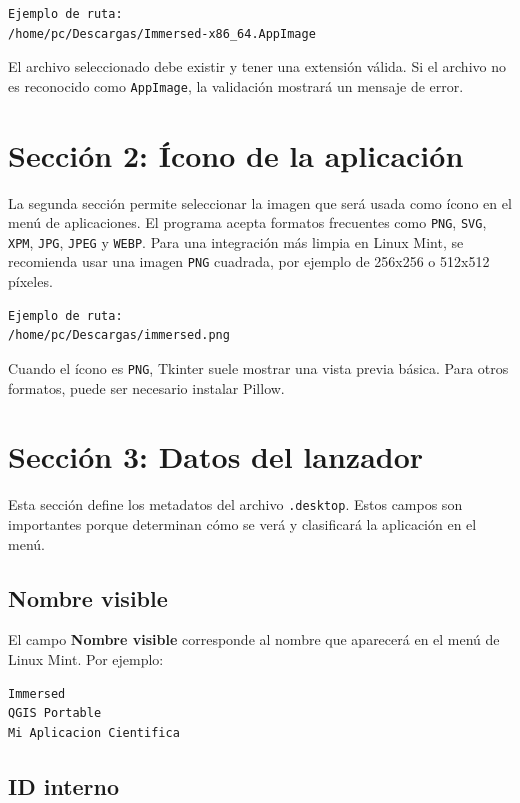 \documentclass[11pt,a4paper]{article}
\begin{document}
\begin{lstlisting}[style=textstyle]
Ejemplo de ruta:
/home/pc/Descargas/Immersed-x86_64.AppImage
\end{lstlisting}

El archivo seleccionado debe existir y tener una extensión válida. Si el archivo no es reconocido como \texttt{AppImage}, la validación mostrará un mensaje de error.

\section{Sección 2: Ícono de la aplicación}

La segunda sección permite seleccionar la imagen que será usada como ícono en el menú de aplicaciones. El programa acepta formatos frecuentes como \texttt{PNG}, \texttt{SVG}, \texttt{XPM}, \texttt{JPG}, \texttt{JPEG} y \texttt{WEBP}. Para una integración más limpia en Linux Mint, se recomienda usar una imagen \texttt{PNG} cuadrada, por ejemplo de 256x256 o 512x512 píxeles.

\begin{lstlisting}[style=textstyle]
Ejemplo de ruta:
/home/pc/Descargas/immersed.png
\end{lstlisting}

Cuando el ícono es \texttt{PNG}, Tkinter suele mostrar una vista previa básica. Para otros formatos, puede ser necesario instalar Pillow.

\section{Sección 3: Datos del lanzador}

Esta sección define los metadatos del archivo \texttt{.desktop}. Estos campos son importantes porque determinan cómo se verá y clasificará la aplicación en el menú.

\subsection{Nombre visible}

El campo \textbf{Nombre visible} corresponde al nombre que aparecerá en el menú de Linux Mint. Por ejemplo:

\begin{lstlisting}[style=textstyle]
Immersed
QGIS Portable
Mi Aplicacion Cientifica
\end{lstlisting}

\subsection{ID interno}
\end{document}
